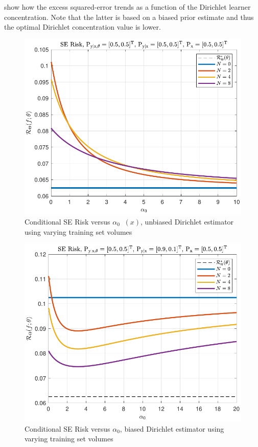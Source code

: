 \documentclass[12pt]{report}
\DeclareMathOperator{\xrm}{\mathrm{x}}
\DeclareMathOperator{\yrm}{\mathrm{y}}
\DeclareMathOperator{\Erm}{\mathrm{E}}
\DeclareMathOperator{\upthetam}{\uptheta_\text{m}}
\DeclareMathOperator{\uppsim}{\uppsi_\text{m}}
\DeclareMathOperator{\alpham}{\alpha_\text{m}}
\begin{document}


 show how the excess squared-error trends as a function of the Dirichlet learner concentration. Note that the latter is based on a biased prior estimate and thus the optimal Dirichlet concentration value is lower.
\begin{figure}
\centering
\includegraphics[width=0.7\linewidth]{Risk_cond_SE_Dir_a0_leg_N_unbiased.pdf}
\caption{Conditional SE Risk versus $\alpha_0 \alpham(x)$, unbiased Dirichlet estimator using varying training set volumes}
\label{fig:Risk_cond_SE_Dir_a0_leg_N_unbiased}
\end{figure}
\begin{figure}
\centering
\includegraphics[width=0.7\linewidth]{Risk_cond_SE_Dir_a0_leg_N_biased.pdf}
\caption{Conditional SE Risk versus $\alpha_0$, biased Dirichlet estimator using varying training set volumes}
\label{fig:Risk_cond_SE_Dir_a0_leg_N_biased}
\end{figure}
\end{document}
